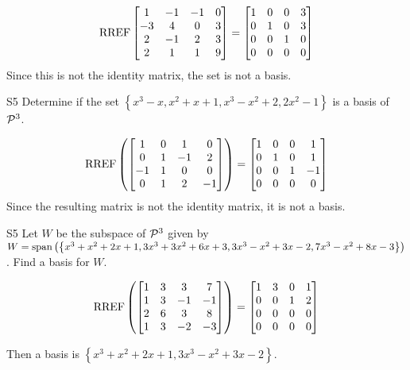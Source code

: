 \begin{solution}
$$\RREF \begin{bmatrix} 1 & -1 & -1 & 0 \\ -3 & 4 & 0 & 3 \\ 2 & -1 & 2 & 3 \\ 2 & 1 & 1 & 9 \end{bmatrix}=\begin{bmatrix} 1 &0 & 0 & 3 \\ 0 & 1 & 0 & 3 \\ 0 & 0 & 1 & 0 \\ 0 & 0 & 0 & 0 \end{bmatrix}$$
Since this is not the identity matrix, the set is not a basis.
\end{solution}


\begin{problem}{S5}
Determine if the set $\left\{ x^3-x, x^2+x+1, x^3-x^2+2, 2x^2-1 \right\}$ is a basis of $\P^3$.
\end{problem}
\begin{solution}
$$\RREF\left(\begin{bmatrix} 1 & 0 & 1 & 0 \\ 0 & 1 & -1 & 2 \\ -1 & 1 & 0 & 0 \\ 0 & 1 & 2 & -1 \end{bmatrix} \right)= \begin{bmatrix} 1 & 0 &0 & 1 \\ 0 & 1 & 0 & 1 \\ 0 & 0 & 1 & -1 \\ 0 & 0 & 0 & 0 \end{bmatrix}$$
Since the resulting matrix is not the identity matrix, it is not a basis.
\end{solution}

\begin{problem}{S5}
Let $W$ be the subspace of $\P^3$ given by $W = {\rm span} \left( \left\{ x^3+x^2+2x+1, 3x^3+3x^2+6x+3, 3x^3-x^2+3x-2, 7x^3-x^2+8x-3 \right\} \right)$.  Find a basis for $W$.
\end{problem}
\begin{solution}
$$\RREF\left(\begin{bmatrix} 1 & 3 & 3 & 7 \\ 1 & 3 & -1 & -1 \\ 2 & 6 & 3 & 8 \\ 1 & 3 & -2 & -3 \end{bmatrix}\right) = \begin{bmatrix} 1 & 3 & 0 & 1 \\ 0 & 0 & 1 & 2 \\ 0 & 0 & 0 & 0 \\  0 & 0 & 0 & 0 \end{bmatrix}$$

Then a basis is
$ \left\{ x^3+x^2+2x+1, 3x^3-x^2+3x-2 \right\} $.
\end{solution}

